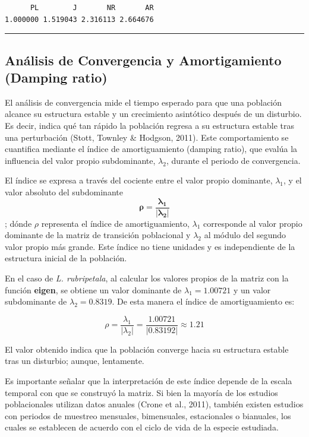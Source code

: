 \documentclass[
  12pt,
  letterpaper,
]{book}
\begin{document}
\begin{verbatim}
      PL        J       NR       AR 
1.000000 1.519043 2.316113 2.664676 
\end{verbatim}

\begin{center}\rule{0.5\linewidth}{0.5pt}\end{center}

\subsection{Análisis de Convergencia y Amortigamiento (Damping
ratio)}\label{anuxe1lisis-de-convergencia-y-amortigamiento-damping-ratio}

El análisis de convergencia mide el tiempo esperado para que una
población alcance su estructura estable y un crecimiento asintótico
después de un disturbio. Es decir, indica qué tan rápido la población
regresa a su estructura estable tras una perturbación (Stott, Townley \&
Hodgson, 2011). Este comportamiento se cuantifica mediante el índice de
amortiguamiento (damping ratio), que evalúa la influencia del valor
propio subdominante, \(\lambda_2\), durante el periodo de convergencia.

El índice se expresa a través del cociente entre el valor propio
dominante, \(\lambda_1\), y el valor absoluto del subdominante
\[\mathbf{\rho=\frac{\lambda_1}{\left|\lambda_2\right|}}\]; dónde
\(\rho\) representa el índice de amortiguamiento, \(\lambda_1\)
corresponde al valor propio dominante de la matriz de transición
poblacional y \(\lambda_2\) al módulo del segundo valor propio más
grande. Este índice no tiene unidades y es independiente de la
estructura inicial de la población.

En el caso de \emph{L. rubripetala}, al calcular los valores propios de
la matriz con la función \textbf{eigen}, se obtiene un valor dominante
de \(\lambda_1= 1.00721\) y un valor subdominante de
\(\lambda_2= 0.8319\). De esta manera el índice de amortiguamiento es:

\[
\rho = \frac{\lambda_1}{|\lambda_2|} = \frac{1.00721}{|0.83192|} \approx 1.21
\]

El valor obtenido indica que la población converge hacia su estructura
estable tras un disturbio; aunque, lentamente.

Es importante señalar que la interpretación de este índice depende de la
escala temporal con que se construyó la matriz. Si bien la mayoría de
los estudios poblacionales utilizan datos anuales (Crone et al., 2011),
también existen estudios con periodos de muestreo mensuales,
bimensuales, estacionales o bianuales, los cuales se establecen de
acuerdo con el ciclo de vida de la especie estudiada.
\end{document}
